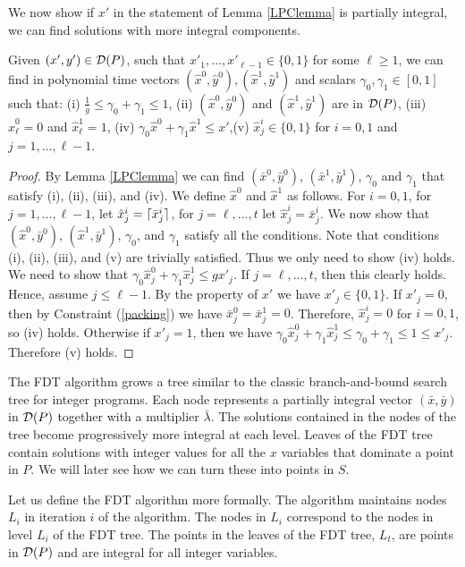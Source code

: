 \documentclass[runningheads]{llncs}
\begin{document}
We now show if $x'$ in the statement of Lemma \ref{LPClemma} is partially integral, we can find solutions with more integral components.
\begin{lemma}\label{round-up}
	Given $(x',y')\in \operatorname{\mathcal{D}}(P)$, such that $x'_1,\ldots,x'_{\ell-1}\in \{0,1\}$ for some $\ell\geq 1$, we can find in polynomial time vectors $(\hat{x}^0,\hat{y}^0),(\hat{x}^1,\hat{y}^1)$ and scalars $\gamma_0,\gamma_1 \in [0,1]$ such that: (i) $\frac{ 1}{g}\leq \gamma_0 + \gamma_1  \leq 1$, (ii) $(\hat{x}^0,\hat{y}^0)$ and $(\hat{x}^1,\hat{y}^1)$ are in  $\operatorname{\mathcal{D}}( P)$, (iii) $\hat{x}^0_\ell=0$ and $\hat{x}^1_\ell=1$, (iv) $ \gamma_0\hat{x}^0 +\gamma_1 \hat{x}^1 \leq
		x'$,(v) $\hat{x}^i_j\in \{0,1\}$ for $i=0,1$ and $j=1,\ldots,\ell-1$.
\end{lemma} 
\begin{proof}
	By Lemma \ref{LPClemma} we can find $(\bar{x}^0,\bar{y}^0)$, $(\bar{x}^1,\bar{y}^1)$, $\gamma_0$ and $\gamma_1$ that satisfy (i), (ii), (iii), and (iv). We define $\hat{x}^0$ and $\hat{x}^1$ as follows. For $i=0,1$, for $j=1,\ldots,\ell-1$, let $\hat{x}^i_j= \lceil\bar{x}^i_j\rceil$, for $j=\ell,\ldots,t$ let $\hat{x}^i_j = \bar{x}^i_j$. We now show that $(\hat{x}^0,\bar{y}^0)$, $(\hat{x}^1,\bar{y}^1)$, $\gamma_0$, and $\gamma_1$ satisfy all the conditions. Note that conditions (i), (ii), (iii), and (v) are trivially satisfied. Thus we only need to show (iv) holds. We need to show that $\gamma_0 \hat{x}^0_j+\gamma_1\hat{x}^1_j\leq gx'_j$. If $j=\ell,\ldots,t$, then this clearly holds. Hence, assume $j\leq \ell-1$. By the property of $x'$ we have $x'_j\in \{0,1\}$. If $x'_j= 0$, then by Constraint (\ref{packing}) we have $\bar{x}^0_j = \bar{x}^1_j=0$. Therefore, $\hat{x}^i_j=0$ for $i=0,1$, so (iv) holds. Otherwise if $x'_j = 1$, then we have
	$\gamma_0\hat{x}^0_j+\gamma_1\hat{x}^1_j\leq \gamma_0+\gamma_1\leq 1\leq x'_j.$ 
	Therefore (v) holds.
\end{proof}
The FDT algorithm grows a tree similar to the classic branch-and-bound search tree for integer programs. Each node represents a partially integral vector $(\bar{x},\bar{y})$ in $\operatorname{\mathcal{D}}(P)$ together with a multiplier $\bar{\lambda}$. The solutions contained in the nodes of the tree become progressively more integral at each level. Leaves of the FDT tree contain solutions with integer values for all the $x$ variables that dominate a point in $P$. We will later see how we can turn these into points in $S$. 

Let us define the FDT algorithm more formally. The algorithm maintains nodes $L_i$ in iteration $i$ of the algorithm. The nodes in $L_i$ correspond to the nodes in level $L_i$ of the FDT tree. The points in the leaves of the FDT tree, $L_t$, are points in $\operatorname{\mathcal{D}}(P)$ and are integral for all integer variables.
\end{document}
